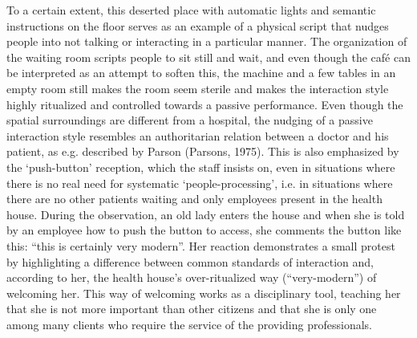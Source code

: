 \par
To a certain extent, this deserted place with automatic lights and semantic instructions on the floor serves as an example of a physical script that nudges people into not talking or interacting in a particular manner. The organization of the waiting room scripts people to sit still and wait, and even though the café can be interpreted as an attempt to soften this, the machine and a few tables in an empty room still makes the room seem sterile and makes the interaction style highly ritualized and controlled towards a passive performance. Even though the spatial surroundings are different from a hospital, the nudging of a passive interaction style resembles an authoritarian relation between a doctor and his patient, as e.g. described by Parson (Parsons, 1975). This is also emphasized by the ‘push-button’ reception, which the staff insists on, even in situations where there is no real need for systematic ‘people-processing’, i.e. in situations where there are no other patients waiting and only employees present in the health house. During the observation, an old lady enters the house and when she is told by an employee how to push the button to access, she comments the button like this: “this is certainly very modern”. Her reaction demonstrates a small protest by highlighting a difference between common standards of interaction and, according to her, the health house’s over-ritualized way (“very-modern”) of welcoming her. This way of welcoming works as a disciplinary tool, teaching her that she is not more important than other citizens and that she is only one among many clients who require the service of the providing professionals.

